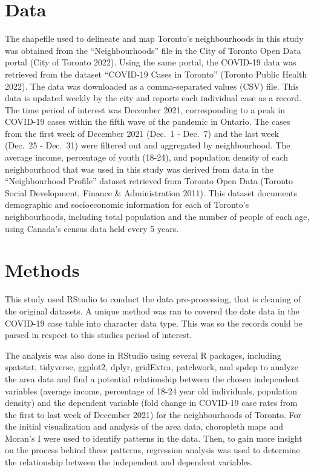 \documentclass[]{article}
\begin{document}
\hypertarget{data}{%
\section{Data}\label{data}}

The shapefile used to delineate and map Toronto's neighbourhoods in this
study was obtained from the ``Neighbourhoods'' file in the City of
Toronto Open Data portal (City of Toronto 2022). Using the same portal,
the COVID-19 data was retrieved from the dataset ``COVID-19 Cases in
Toronto'' (Toronto Public Health 2022). The data was downloaded as a
comma-separated values (CSV) file. This data is updated weekly by the
city and reports each individual case as a record. The time period of
interest was December 2021, corresponding to a peak in COVID-19 cases
within the fifth wave of the pandemic in Ontario. The cases from the
first week of December 2021 (Dec.~1 - Dec.~7) and the last week (Dec.~25
- Dec.~31) were filtered out and aggregated by neighbourhood. The
average income, percentage of youth (18-24), and population density of
each neighbourhood that was used in this study was derived from data in
the ``Neighbourhood Profile'' dataset retrieved from Toronto Open Data
(Toronto Social Development, Finance \& Administration 2011). This
dataset documents demographic and socioeconomic information for each of
Toronto's neighbourhoods, including total population and the number of
people of each age, using Canada's census data held every 5 years.

\hypertarget{methods}{%
\section{Methods}\label{methods}}

This study used RStudio to conduct the data pre-processing, that is
cleaning of the original datasets. A unique method was ran to covered
the date data in the COVID-19 case table into character data type. This
was so the records could be parsed in respect to this studies period of
interest.

The analysis was also done in RStudio using several R packages,
including spatstat, tidyverse, ggplot2, dplyr, gridExtra, patchwork, and
spdep to analyze the area data and find a potential relationship between
the chosen independent variables (average income, percentage of 18-24
year old individuals, population density) and the dependent variable
(fold change in COVID-19 case rates from the first to last week of
December 2021) for the neighbourhoods of Toronto. For the initial
visualization and analysis of the area data, choropleth maps and Moran's
I were used to identify patterns in the data. Then, to gain more insight
on the process behind these patterns, regression analysis was used to
determine the relationship between the independent and dependent
variables.
\end{document}
